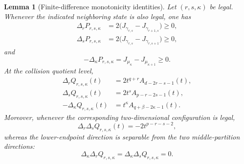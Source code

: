 \documentclass[10pt,a4paper]{amsart}
\newtheorem{lemma}[theorem]{Lemma}
\begin{document}
\begin{lemma}[Finite-difference monotonicity identities]
\label{lem:finite-difference-monotonicity}
Let \((r,s,\kappa)\) be legal.
Whenever the indicated neighboring state is also legal, one has
\begin{align*}
\Delta_rP_{r,s,\kappa}
&=
2\bigl(J_{\gamma_{r,s}}-J_{\gamma_{r+1,s}}\bigr)
\ge0,\\
\Delta_sP_{r,s,\kappa}
&=
2\bigl(J_{\gamma_{r,s}}-J_{\gamma_{r,s+1}}\bigr)
\ge0,
\end{align*}
and
\begin{equation*}
-\Delta_\kappa P_{r,s,\kappa}
=
J_{\mu_\kappa}-J_{\mu_{\kappa+1}}
\ge0.
\end{equation*}
At the collision quotient level,
\begin{align*}
\Delta_rQ_{r,s,\kappa}(t)
&=
2t^{q+r}A_{d-2r-s-1}(t),\\
\Delta_sQ_{r,s,\kappa}(t)
&=
2t^sA_{p-r-2s-1}(t),\\
-\Delta_\kappa Q_{r,s,\kappa}(t)
&=
t^\kappa A_{q+\beta-2\kappa-1}(t).
\end{align*}
Moreover, whenever the corresponding two-dimensional configuration is legal,
\begin{equation*}
\Delta_r\Delta_sQ_{r,s,\kappa}(t)
=
-2t^{p-r-s-2},
\end{equation*}
whereas the lower-endpoint direction is separable from the two middle-partition directions:
\begin{equation*}
\Delta_\kappa\Delta_rQ_{r,s,\kappa}
=
\Delta_\kappa\Delta_sQ_{r,s,\kappa}
=
0.
\end{equation*}
\end{lemma}
\end{document}
